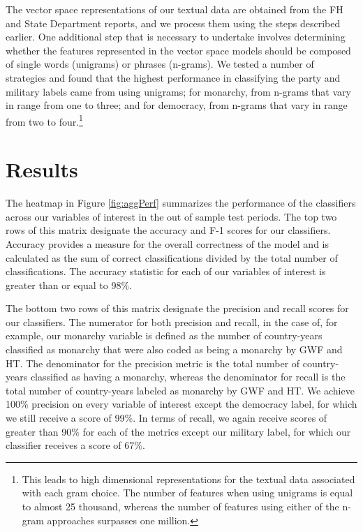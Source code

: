 \documentclass[pdftex,12pt,fullpage,oneside]{amsart}
\begin{document}
The vector space representations of our textual data are obtained from the FH and State Department reports, and we process them using the steps described earlier. One additional step that is necessary to undertake involves determining whether the features represented in the vector space models should be composed of single words (unigrams) or phrases (n-grams). We tested a number of strategies and found that the highest performance in classifying the party and military labels came from using unigrams; for monarchy, from n-grams that vary in range from one to three; and for democracy, from n-grams that vary in range from two to four.\footnote{This leads to high dimensional representations for the textual data associated with each gram choice. The number of features when using unigrams is equal to almost 25 thousand, whereas the number of features using either of the n-gram approaches surpasses one million.}

\section{Results}

The heatmap in Figure \ref{fig:aggPerf} summarizes the performance of the classifiers across our variables of interest in the out of sample test periods. The top two rows of this matrix designate the accuracy and F-1 scores for our classifiers. Accuracy provides a measure for the overall correctness of the model and is calculated as the sum of correct classifications divided by the total number of classifications. The accuracy statistic for each of our variables of interest is greater than or equal to 98\%. 

The bottom two rows of this matrix designate the precision and recall scores for our classifiers. The numerator for both precision and recall, in the case of, for example, our monarchy variable is defined as the number of country-years classified as monarchy that were also coded as being a monarchy by GWF and HT. The denominator for the precision metric is the total number of country-years classified as having a monarchy, whereas the denominator for recall is the total number of country-years labeled as monarchy by GWF and HT. We achieve 100\% precision on every variable of interest except the democracy label, for which we still receive a score of 99\%. In terms of recall, we again receive scores of greater than 90\% for each of the metrics except our military label, for which our classifier receives a score of 67\%. 
\end{document}
